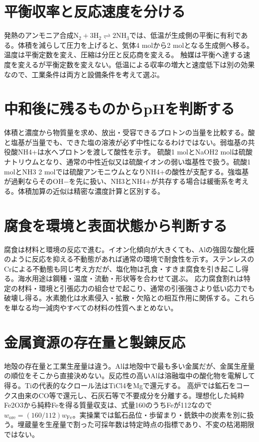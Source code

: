 \section{平衡収率と反応速度を分ける}
\label{theory:basicchem:equilibrium}
発熱のアンモニア合成\(\mathrm{N_2+3H_2\rightleftharpoons2NH_3}\)では、低温が生成側の平衡に有利である。体積を減らして圧力を上げると、気体4 molから2 molとなる生成側へ移る。温度は平衡定数を変え、圧縮は分圧と反応商を変える\autocite{chem55_equilibrium}。
触媒は平衡へ達する速度を変えるが平衡定数を変えない。低温による収率の増大と速度低下は別の効果なので、工業条件は両方と設備条件を考えて選ぶ。

\section{中和後に残るものからpHを判断する}
\label{theory:basicchem:neutralization}
体積と濃度から物質量を求め、放出・受容できるプロトンの当量を比較する。酸と塩基が当量でも、できた塩の溶液が必ず中性になるわけではない。弱塩基の共役酸NH4+は水へプロトンを渡して酸性を示す\autocite{chem55_hydrolysis}。
硫酸1 molとNaOH2 molは硫酸ナトリウムとなり、通常の中性近似又は硫酸イオンの弱い塩基性で扱う。硫酸1 molとNH3 2 molでは硫酸アンモニウムとなりNH4+の酸性が支配する。強塩基が過剰ならそのOH−を先に扱い、NH3とNH4+が共存する場合は緩衝系を考える。体積加算の近似は精密な濃度計算と区別する。

\section{腐食を環境と表面状態から判断する}
\label{theory:basicchem:corrosion}
腐食は材料と環境の反応で進む。イオン化傾向が大きくても、Alの強固な酸化膜のように反応を抑える不動態があれば通常の環境で耐食性を示す。ステンレスのCrによる不動態も同じ考え方だが、塩化物は孔食・すきま腐食を引き起こし得る\autocite{chem55_corrosion,stainless_definition2022}。海水用途は鋼種・温度・流動・形状等を合わせて選ぶ。
応力腐食割れは特定の材料・環境と引張応力の組合せで起こり、通常の引張強さより低い応力でも破壊し得る。水素脆化は水素侵入・拡散・欠陥との相互作用に関係する\autocite{nims_hydrogen2024}。これらを単なる均一減肉やすべての材料の性質へまとめない。

\section{金属資源の存在量と製錬反応}
\label{theory:basicchem:metallurgy}
地殻の存在量と工業生産量は違う。Alは地殻中で最も多い金属だが、金属生産量の順位をそこから直接決めない。反応性の高いAlは溶融塩中の酸化物を電解して得る\autocite{chem55_crust}。Tiの代表的なクロール法はTiCl4をMgで還元する\autocite{chem55_kroll}。
高炉では鉱石をコークス由来のCO等で還元し、石灰石等で不要成分を分離する\autocite{chem55_iron}。理想化した純粋Fe2O3から純粋Feを得る質量収支は、式量160のうちFeが112なので\(w_{\mathrm{ore}}=(160/112)w_{\mathrm{Fe}}\)。実操業では鉱石品位・歩留まり・銑鉄中の炭素を別に扱う。埋蔵量を生産量で割った可採年数は特定時点の指標であり、不変の枯渇期限ではない。

